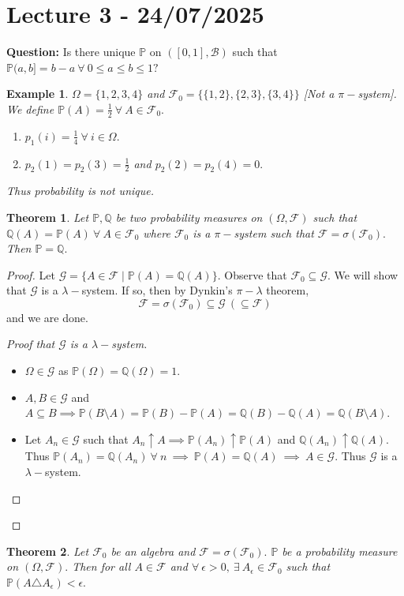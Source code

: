 \documentclass{article}
\newcommand{\1}{\mathds{1}}
\newcommand{\Q}{\mathbb{Q}}
\newcommand{\F}{\mathcal{F}}
\newcommand{\B}{\mathcal{B}}
\newcommand{\G}{\mathcal{G}}
\newcommand{\PB}{\mathbb{P}}
\newcommand{\f}[2]{\frac{#1}{#2}}
\newcommand{\sm}{\setminus}
\newtheorem{theorem}{Theorem}[section]
\newtheorem{example}{Example}
\begin{document}
\section{Lecture 3 - 24/07/2025}
\textbf{Question:} Is there unique $\PB$ on $([0,1],\B)$ such that $\PB(a,b]=b-a\ \forall\ 0\leq a\leq b\leq 1?$
\begin{example}
    $\Omega=\{1,2,3,4\}$ and $\F_0=\{\{1,2\},\{2,3\},\{3,4\}\}$ [Not a $\pi-$system]. We define $\PB(A)=\f12\ \forall\ A\in\F_0.$
    \begin{enumerate}
        \item $p_1(i)=\f14\ \forall\ i\in\Omega.$
        \item $p_2(1)=p_2(3)=\f12$ and $p_2(2)=p_2(4)=0.$
    \end{enumerate}
    Thus probability is not unique.
\end{example}
\begin{theorem}
    Let $\PB,\Q$ be two probability measures on $(\Omega,\F)$ such that $\Q(A)=\PB(A)\ \forall\ A\in\F_0$ where $\F_0$ is a $\pi-$system such that $\F=\sigma(\F_0).$ Then $\PB=\Q.$
\end{theorem}
\begin{proof}
    Let $\G=\{A\in\F\mid \PB(A)=\Q(A)\}.$ Observe that $\F_0\subseteq\G.$ We will show that $\G$ is a $\lambda-$system. If so, then by Dynkin's $\pi-\lambda$ theorem, $$\F=\sigma(\F_0)\subseteq \G\ (\subseteq\F)$$ and we are done.
    \begin{proof}[Proof that $\G$ is a $\lambda-$system]
        \begin{itemize}
            \item $\Omega\in\G$ as $\PB(\Omega)=\Q(\Omega)=1.$
            \item $A,B\in\G$ and $A\subseteq B\implies \PB(B\sm A)=\PB(B)-\PB(A)=\Q(B)-\Q(A)=\Q(B\sm A).$
            \item Let $A_n\in\G$ such that $A_n\uparrow A\implies\PB(A_n)\uparrow \PB(A)$ and $\Q(A_n)\uparrow \Q(A).$ Thus $\PB(A_n)=\Q(A_n)\ \forall\ n\ \implies\ \PB(A)=\Q(A)\ \implies\ A\in\G.$ Thus $\G$ is a $\lambda-$system.
        \end{itemize}
    \end{proof}
\end{proof} 
\begin{theorem}
Let $\F_0$ be an algebra and $\F=\sigma(\F_0).$ $\PB$ be a probability measure on $(\Omega,\F).$ Then for all $A\in\F$ and $\forall\ \epsilon>0,\ \exists\ A_\epsilon\in\F_0$ such that $\PB(A\triangle A_\epsilon)<\epsilon.$
\end{theorem}
\end{document}
